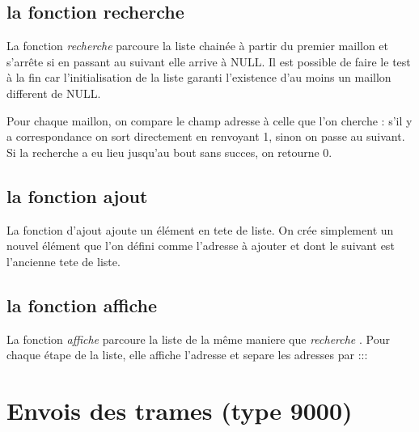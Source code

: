 \documentclass[a4paper,11pt]{article}
\begin{document}
	\subsection{la fonction recherche}
	La fonction \textit{ recherche} parcoure la liste chainée à partir du premier maillon et s'arrête si en passant au suivant elle arrive à NULL. Il est possible de faire le test à la fin car l'initialisation de la liste garanti l'existence d'au moins un maillon different de NULL.

	Pour chaque maillon, on compare le champ adresse à celle que l'on cherche : s'il y a correspondance on sort directement en renvoyant 1, sinon on passe au suivant. Si la recherche a eu lieu jusqu'au bout sans succes, on retourne 0.
	\subsection{la fonction ajout}
	La fonction d'ajout ajoute un élément en tete de liste. On crée simplement un nouvel élément que l'on défini comme l'adresse à ajouter et dont le suivant est l'ancienne tete de liste.
	\subsection{la fonction affiche}
	La fonction  \textit{affiche} parcoure la liste de la même maniere que  \textit{recherche} . Pour chaque étape de la liste, elle affiche l'adresse et separe les adresses par :::
	\section{Envois des trames (type 9000)}
\end{document}
